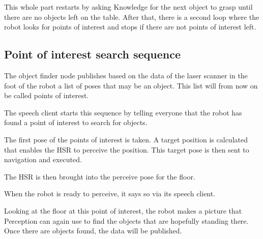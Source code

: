 \documentclass[main.tex]{subfiles}
\begin{document}
	\begin{planning}
	This whole part restarts by asking Knowledge for the next object to grasp until there are no objects left on the table. After that, there is a second loop where the robot looks for points of interest and stops if there are not points of interest left.
	\end{planning}
	
	\subsection{Point of interest search sequence}
	\begin{navigation}
	The object finder node publishes based on the data of the laser scanner in the foot of the robot a list of poses that may be an object. This list will from now on be called points of interest.
	\end{navigation}
	
    \begin{nlp}
    The speech client starts this sequence by telling everyone that the robot has found a point of interest to search for objects.
    \end{nlp}
    
    \begin{planning}
    The first pose of the points of interest is taken. A target position is calculated that enables the HSR to perceive the position.
    This target pose is then sent to navigation and executed.
   \end{planning}
   
    \begin{manipulation}
    The HSR is then brought into the perceive pose for the floor.
    \end{manipulation}
    
    \begin{nlp}
    When the robot is ready to perceive, it says so via its speech client.
    \end{nlp}
      
    \begin{perception}
	Looking at the floor at this point of interest, the robot makes a picture that Perception can again use to find the objects that are hopefully standing there. Once there are objects found, the data will be published.
	\end{perception}
    
\end{document}
